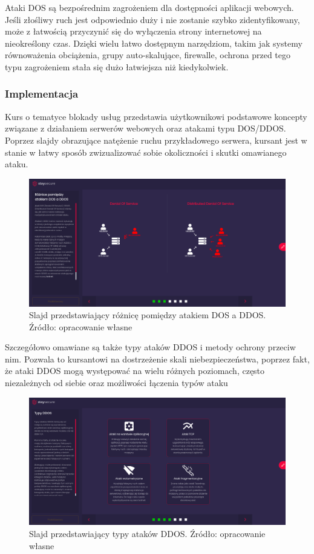 \documentclass[12pt,twoside]{article}
\begin{document}
Ataki DOS są bezpośrednim zagrożeniem dla dostępności aplikacji webowych. Jeśli złośliwy ruch jest odpowiednio duży i nie zostanie szybko zidentyfikowany, może z łatwością przyczynić się do wyłączenia strony internetowej na nieokreślony czas. Dzięki wielu łatwo dostępnym narzędziom, takim jak systemy równoważenia obciążenia, grupy auto-skalujące, firewalle, ochrona przed tego typu zagrożeniem stała się dużo łatwiejsza niż kiedykolwiek.

\subsubsection{Implementacja}

Kurs o tematyce blokady usług przedstawia użytkownikowi podstawowe koncepty związane z działaniem serwerów webowych oraz atakami typu DOS/DDOS. Poprzez slajdy obrazujące natężenie ruchu przykładowego serwera, kursant jest w stanie w łatwy sposób zwizualizować sobie okoliczności i skutki omawianego ataku.

\begin{figure}[H]
	\centering
	\includegraphics[width=0.99\linewidth]{figures/dos-slide-screenshot1}
	\caption{Slajd przedstawiający różnicę pomiędzy atakiem DOS a DDOS. Źródło: opracowanie własne}
\end{figure}

Szczegółowo omawiane są także typy ataków DDOS i metody ochrony przeciw nim.
Pozwala to kursantowi na dostrzeżenie skali niebezpieczeństwa, poprzez fakt, że ataki DDOS mogą występować na wielu różnych poziomach, często niezależnych od siebie oraz możliwości łączenia typów ataku

\begin{figure}[H]
	\centering
	\includegraphics[width=0.99\linewidth]{figures/dos-slide-screenshot2}
	\caption{Slajd przedstawiający typy ataków DDOS. Źródło: opracowanie własne}
\end{figure}
\end{document}
